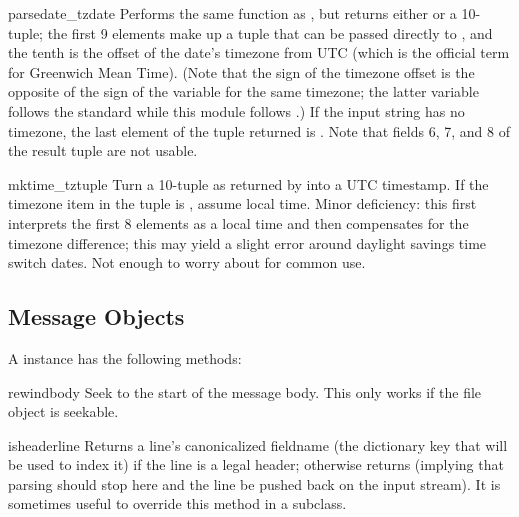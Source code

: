 \begin{funcdesc}{parsedate_tz}{date}
Performs the same function as , but returns
either  or a 10-tuple; the first 9 elements make up a tuple
that can be passed directly to , and the tenth
is the offset of the date's timezone from UTC (which is the official
term for Greenwich Mean Time).  (Note that the sign of the timezone
offset is the opposite of the sign of the 
variable for the same timezone; the latter variable follows the
\POSIX{} standard while this module follows .)  If the input
string has no timezone, the last element of the tuple returned is
.  Note that fields 6, 7, and 8 of the result tuple are not
usable.
\end{funcdesc}

\begin{funcdesc}{mktime_tz}{tuple}
Turn a 10-tuple as returned by  into a UTC
timestamp.  If the timezone item in the tuple is , assume
local time.  Minor deficiency: this first interprets the first 8
elements as a local time and then compensates for the timezone
difference; this may yield a slight error around daylight savings time
switch dates.  Not enough to worry about for common use.
\end{funcdesc}


\begin{seealso}
\end{seealso}


\subsection{Message Objects \label{message-objects}}

A  instance has the following methods:

\begin{methoddesc}{rewindbody}{}
Seek to the start of the message body.  This only works if the file
object is seekable.
\end{methoddesc}

\begin{methoddesc}{isheader}{line}
Returns a line's canonicalized fieldname (the dictionary key that will
be used to index it) if the line is a legal  header; otherwise
returns  (implying that parsing should stop here and the
line be pushed back on the input stream).  It is sometimes useful to
override this method in a subclass.
\end{methoddesc}

